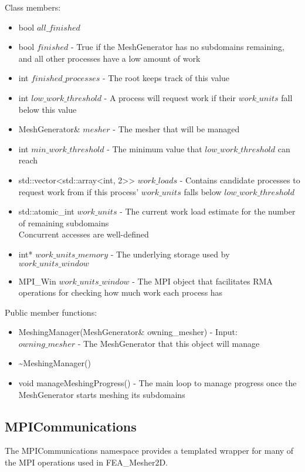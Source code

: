 \documentclass[manuscript, screen]{acmart}
\begin{document}
Class members:
\begin{itemize}
\item bool $all\_finished$
\item bool $finished$ - True if the MeshGenerator has no subdomains remaining, and all other processes have a low amount of work
\item int $finished\_processes$ - The root keeps track of this value
\item int $low\_work\_threshold$ - A process will request work if their $work\_units$ fall below this value
\item MeshGenerator\& $mesher$ - The mesher that will be managed
\item int $min\_work\_threshold$ - The minimum value that $low\_work\_threshold$ can reach
\item std::vector<std::array<int, 2>> $work\_loads$ - Contains candidate processes to request work from if this process' $work\_units$ falls below $low\_work\_threshold$
\item std::atomic\_int $work\_units$ - The current work load estimate for the number of remaining subdomains\\
Concurrent accesses are well-defined
\item int* $work\_units\_memory$ - The underlying storage used by $work\_units\_window$
\item MPI\_Win $work\_units\_window$ - The MPI object that facilitates RMA operations for checking how much work each process has

\end{itemize}

Public member functions:
\begin{itemize}
\item MeshingManager(MeshGenerator\& owning\_mesher) - Input:\\
$owning\_mesher$ - The MeshGenerator that this object will manage

\item \textasciitilde{}MeshingManager()
%

\item void manageMeshingProgress() - The main loop to manage progress once the MeshGenerator starts meshing its subdomains
\end{itemize}

\subsection{MPICommunications}
The MPICommunications namespace provides a templated wrapper for many of the MPI operations used in FEA\_Mesher2D.
\end{document}
